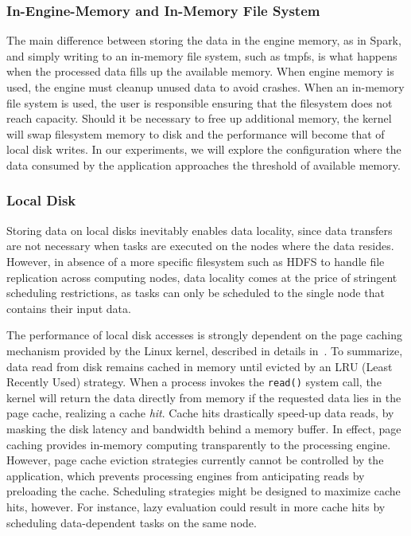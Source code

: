 \subsubsection{In-Engine-Memory and In-Memory File System} 

 The main difference between storing the data in the engine memory, as in Spark, 
 and simply writing to an in-memory file system, such as tmpfs, is 
 what happens when the processed data fills up the available 
 memory. When engine memory is used, the engine must cleanup 
 unused data to avoid crashes. When an in-memory 
 file system is used, the user is responsible ensuring that the filesystem does not
 reach capacity. Should it be necessary to free up additional memory, the kernel will swap filesystem memory to disk
 and the performance will become that of local disk writes. In our experiments, 
 we will explore the configuration where the data consumed by the 
 application approaches the threshold of available memory.

\subsubsection{Local Disk} %


Storing data on local disks inevitably enables data locality, since data transfers are
not necessary when tasks are executed on the nodes where the data resides.
However, in absence of a more specific 
filesystem such as HDFS to handle 
file replication across computing nodes, data locality comes at the price
of stringent scheduling restrictions, as tasks can only be scheduled to the
single node that contains their input data.


The performance of local disk accesses is strongly dependent on the 
page caching mechanism provided by the Linux kernel, described in    
details in~\cite{love2010linux}. To summarize, data read from disk 
remains cached in memory until evicted by an LRU (Least Recently Used) 
strategy. When a process invokes the \texttt{read()} system call, the 
kernel will return the data directly from memory if the requested data 
lies in the page cache, realizing a cache \emph{hit}. Cache hits drastically speed-up data 
reads, by masking the disk latency and bandwidth behind a 
memory buffer. In effect, page caching provides in-memory computing 
transparently to the processing engine. However, page cache eviction 
strategies currently cannot be controlled by the application, which 
prevents processing engines from anticipating reads by preloading the 
cache. Scheduling strategies might be designed 
to maximize cache hits, however. For instance, lazy 
evaluation could result in more cache hits by scheduling data-dependent 
tasks on the same node.

